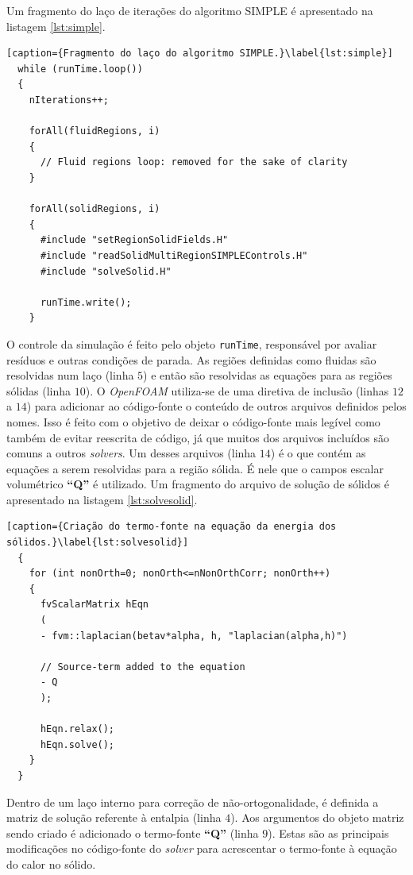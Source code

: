Um fragmento do laço de iterações do algoritmo SIMPLE é apresentado na listagem \ref{lst:simple}.

\begin{lstlisting}[caption={Fragmento do laço do algoritmo SIMPLE.}\label{lst:simple}]
  while (runTime.loop())
  {
    nIterations++;

    forAll(fluidRegions, i)
    {
      // Fluid regions loop: removed for the sake of clarity
    }
    
    forAll(solidRegions, i)
    {
      #include "setRegionSolidFields.H"
      #include "readSolidMultiRegionSIMPLEControls.H"
      #include "solveSolid.H"
      
      runTime.write();
    }
\end{lstlisting}

O controle da simulação é feito pelo objeto \texttt{runTime}, responsável por avaliar resíduos
e outras condições de parada. As regiões definidas como fluidas são resolvidas num laço (linha $5$)
e então são resolvidas as equações para as regiões sólidas (linha $10$). O \textit{OpenFOAM} utiliza-se
de uma diretiva de inclusão (linhas $12$ a $14$) para adicionar ao código-fonte o conteúdo de outros
arquivos definidos pelos nomes. Isso é feito com o objetivo de deixar o código-fonte mais legível como
também de evitar reescrita de código, já que muitos dos arquivos incluídos são comuns a outros
\textit{solvers}. Um desses arquivos (linha $14$) é o que contém as equações a serem resolvidas para
a região sólida. É nele que o campos escalar volumétrico \textbf{``Q''} é utilizado. Um fragmento
do arquivo de solução de sólidos é apresentado na listagem \ref{lst:solvesolid}.

\begin{lstlisting}[caption={Criação do termo-fonte na equação da energia dos sólidos.}\label{lst:solvesolid}]
  {
    for (int nonOrth=0; nonOrth<=nNonOrthCorr; nonOrth++)
    {
      fvScalarMatrix hEqn
      (
      - fvm::laplacian(betav*alpha, h, "laplacian(alpha,h)")

      // Source-term added to the equation
      - Q
      );

      hEqn.relax();
      hEqn.solve();
    }
  }
\end{lstlisting}

Dentro de um laço interno para correção de não-ortogonalidade, é definida a matriz de solução
referente à entalpia (linha $4$). Aos argumentos do objeto matriz sendo criado é adicionado
o termo-fonte \textbf{``Q''} (linha $9$). Estas são as principais
modificações no código-fonte do \textit{solver} para
acrescentar o termo-fonte à equação do calor no sólido.

